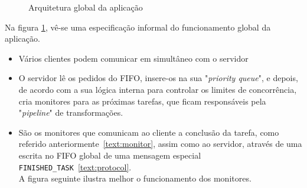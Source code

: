 \documentclass[11pt,a4paper]{report}%
\begin{document}
\begin{figure}
\centering
{}
\caption{Arquitetura global da aplicação}
\label{fig:architecture}
\end{figure}

Na figura \ref{fig:architecture}, vê-se uma especificação informal do funcionamento global
da aplicação.

\begin{itemize}
  \item Vários clientes podem comunicar em simultâneo com o servidor
  \item O servidor lê os pedidos do FIFO, insere-os na sua "\textit{priority queue}", e depois,
  de acordo com a sua lógica interna para controlar os limites de concorrência, cria monitores para as próximas
  tarefas, que ficam responsáveis pela "\textit{pipeline}" de transformações.
  \item São os monitores que comunicam ao cliente a conclusão da tarefa, como referido
  anteriormente~\ref{text:monitor}, assim como ao servidor, através de uma escrita no FIFO global de uma
  mensagem especial \texttt{FINISHED\_TASK}~\ref{text:protocol}.\\
  A figura seguinte ilustra melhor o funcionamento dos monitores.

\end{itemize}
\end{document}
